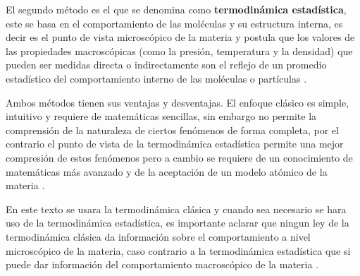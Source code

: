 \documentclass[master.tex]{subfiles}
\begin{document}
    El segundo método es el que se denomina como \textbf{termodinámica estadística}, este se basa en el comportamiento de las moléculas y su estructura interna, es decir es el punto de vista microscópico de la materia y postula que los valores de las propiedades macroscópicas (como la presión, temperatura y la densidad) que pueden ser medidas directa o indirectamente son el reflejo de un promedio estadístico del comportamiento interno de las moléculas o partículas \parencites{faires}{wark}.

    Ambos métodos tienen sus ventajas y desventajas. El enfoque clásico es simple, intuitivo y requiere de matemáticas sencillas, sin embargo no permite la comprensión de la naturaleza de ciertos fenómenos de forma completa, por el contrario el punto de vista de la termodinámica estadística permite una mejor compresión de estos fenómenos pero a cambio se requiere de un conocimiento de matemáticas más avanzado y de la aceptación de un modelo atómico de la materia \parencite{faires}. 

    En este texto se usara la termodinámica clásica y cuando sea necesario se hara uso de la termodinámica estadística, es importante aclarar que ningun ley de la termodinámica clásica da información sobre el comportamiento a nivel microscópico de la materia, caso contrario a la termodinámica estadística que si puede dar información del comportamiento macroscópico de la materia \parencite{smith-vanness}. 
    
    
\printbibliography[title=Bibliografía del capítulo]
    
\end{document}
